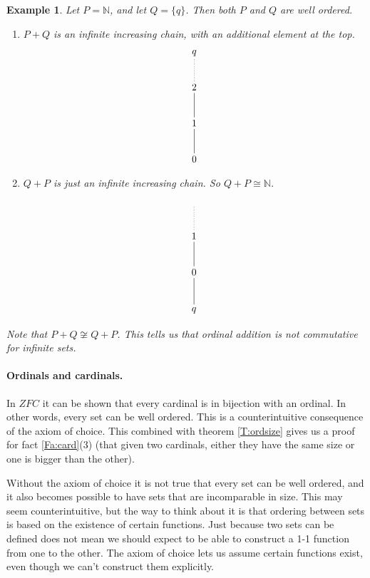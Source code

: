 \documentclass{article}
\theoremstyle{plain}
\newtheorem{example}[theorem]{Example}{\bfseries}{\upshape}
\newcommand{\bN}{\mathbb{N}}
\begin{document}
\begin{example}Let $P= \bN$, and let $Q= \{q\}$. Then both $P$ and $Q$ are well ordered.
\begin{enumerate}
\item $P+Q$ is an infinite increasing chain, with an additional element at the top. 
\[\xymatrix{
q\\
2\ar@{-}[d]\ar@{..}[u]  \\
1\ar@{-}[d]  \\
0 
}\] 
\item $Q+P$ is just an infinite increasing chain. So $Q+P\cong \bN$.
\[\xymatrix{
\text{\phantom{x}}\\
1\ar@{-}[d]\ar@{..}[u]  \\
0 \ar@{-}[d]  \\
q 
}\] 
\end{enumerate}
Note that $P+Q\not\cong Q+P$. This tells us that ordinal addition is not commutative for infinite sets.
\end{example}

\paragraph{Ordinals and cardinals.} 
In $ZFC$ it can be shown that every cardinal is in bijection with an ordinal. In other words, every set can be well ordered. This is a counterintuitive consequence of the axiom of choice. This combined with theorem \ref{T:ordsize} gives us a proof for fact \ref{Fa:card}(3) (that given two cardinals, either they have the same size or one is bigger than the other). 

Without the axiom of choice it is not true that every set can be well ordered, and it also becomes possible to have sets that are incomparable in size. This may seem counterintuitive, but the way to think about it is that ordering between sets is based on the existence of certain functions. Just because two sets can be defined does not mean we should expect to be able to construct a 1-1 function from one to the other. The axiom of choice lets us assume certain functions exist, even though we can't construct them explicitly. 
\end{document}
